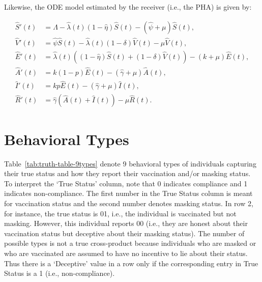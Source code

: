 \documentclass[sigconf,review]{acmart}
\begin{document}
Likewise, the ODE model estimated by the receiver (i.e., the PHA) is given by:

\begin{align}
\hat{S}'(t) &= \Lambda - \hat{\lambda}(t) (1 - \hat{\eta}) \hat{S}(t) - (\hat{\psi} + \mu) \hat{S}(t), \nonumber \\
\hat{V}'(t) &= \hat{\psi} \hat{S}(t) - \hat{\lambda}(t) (1 - \delta) \hat{V}(t) - \mu \hat{V}(t), \nonumber \\
\hat{E}'(t) &= \hat{\lambda}(t) \left((1 - \hat{\eta}) \hat{S}(t) + (1 - \delta) \hat{V}(t)\right) - (k + \mu) \hat{E}(t), \nonumber \\
\hat{A}'(t) &= k(1 - p) \hat{E}(t) - (\hat{\gamma} + \mu) \hat{A}(t), \nonumber \\
\hat{I}'(t) &= kp \hat{E}(t) - (\hat{\gamma} + \mu) \hat{I}(t), \nonumber \\
\hat{R}'(t) &= \hat{\gamma} (\hat{A}(t) + \hat{I}(t)) - \mu \hat{R}(t).
\label{eq_ODE_est}
\end{align}



\section{Behavioral Types}
Table~\ref{tab:truth-table-9types}
denote 9 behavioral types of individuals capturing their true status and how they report their vaccination and/or masking status. To interpret the `True Status' column, note that 0 indicates compliance and 1 indicates non-compliance. The first number in the True Status column is meant for vaccination status and the second number denotes masking status. 
In row 2, for instance, the true status is 01, i.e., the individual is vaccinated but not masking.
However, this individual reports 00 (i.e., they are honest about their vaccination status but deceptive about their masking status). The number of possible types is not a true cross-product because individuals who are masked or who are vaccinated are assumed to have no incentive to lie about their status. Thus there is a `Deceptive' value in a row only if the corresponding entry in True Status is a 1 (i.e., non-compliance).
\end{document}
